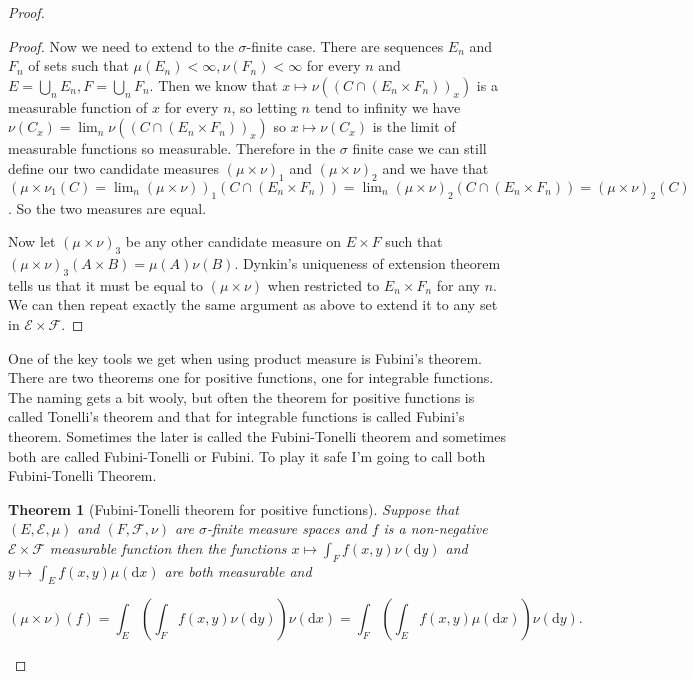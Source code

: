 \documentclass[
]{book}
\newtheorem{theorem}{Theorem}[chapter]
\theoremstyle{definition}
\theoremstyle{definition}
\theoremstyle{definition}
\theoremstyle{definition}
\theoremstyle{remark}
\begin{document}
\begin{proof}
\begin{proof}
Now we need to extend to the \(\sigma\)-finite case. There are sequences \(E_n\) and \(F_n\) of sets such that \(\mu(E_n)<\infty, \nu(F_n)< \infty\) for every \(n\) and \(E= \bigcup_n E_n, F = \bigcup_n F_n\). Then we know that \(x \mapsto \nu((C \cap (E_n \times F_n))_x)\) is a measurable function of \(x\) for every \(n\), so letting \(n\) tend to infinity we have \(\nu(C_x) = \lim_n \nu((C \cap (E_n \times F_n))_x)\) so \(x \mapsto \nu(C_x)\) is the limit of measurable functions so measurable. Therefore in the \(\sigma\) finite case we can still define our two candidate measures \((\mu \times \nu)_1\) and \((\mu \times \nu)_2\) and we have that \((\mu \times \nu_1(C) = \lim_n (\mu \times \nu))_1(C \cap (E_n \times F_n)) = \lim_n (\mu \times \nu)_2 ( C \cap (E_n \times F_n)) = (\mu \times \nu)_2 (C)\). So the two measures are equal.

Now let \((\mu \times \nu)_3\) be any other candidate measure on \(E \times F\) such that \((\mu \times \nu)_3 (A \times B) = \mu(A) \nu(B)\). Dynkin's uniqueness of extension theorem tells us that it must be equal to \((\mu \times \nu)\) when restricted to \(E_n \times F_n\) for any \(n\). We can then repeat exactly the same argument as above to extend it to any set in \(\mathcal{E} \times \mathcal{F}\).
\end{proof}

One of the key tools we get when using product measure is Fubini's theorem. There are two theorems one for positive functions, one for integrable functions. The naming gets a bit wooly, but often the theorem for positive functions is called Tonelli's theorem and that for integrable functions is called Fubini's theorem. Sometimes the later is called the Fubini-Tonelli theorem and sometimes both are called Fubini-Tonelli or Fubini. To play it safe I'm going to call both Fubini-Tonelli Theorem.

\begin{theorem}[Fubini-Tonelli theorem for positive functions]
Suppose that \((E, \mathcal{E}, \mu)\) and \((F, \mathcal{F}, \nu)\) are \(\sigma\)-finite measure spaces and \(f\) is a non-negative \(\mathcal{E} \times \mathcal{F}\) measurable function then the functions \(x \mapsto \int_F f(x,y) \nu(\mathrm{d}y)\) and \(y \mapsto \int_E f(x,y) \mu(\mathrm{d}x)\) are both measurable and

\[(\mu \times \nu)(f) = \int_E \left( \int_F f(x,y) \nu(\mathrm{d}y) \right) \nu(\mathrm{d}x) = \int_F \left( \int_E f(x,y) \mu(\mathrm{d}x) \right) \nu(\mathrm{d}y). \]
\end{theorem}


\end{proof}
\end{document}
